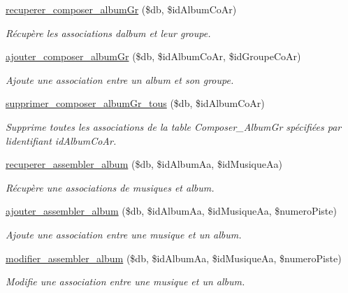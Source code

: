 \begin{DoxyCompactItemize}
\hyperlink{fonctionAlbum_8php_aadff6d61fc94c40b1db762393db06bb7}{recuperer\+\_\+composer\+\_\+album\+Gr} (\$db, \$id\+Album\+Co\+Ar)
\begin{DoxyCompactList}\small\item\em Récupère les associations d\textquotesingle{}album et leur groupe. \end{DoxyCompactList}\item 
\hyperlink{fonctionAlbum_8php_a41addf019effc704735ac3687dcf31bd}{ajouter\+\_\+composer\+\_\+album\+Gr} (\$db, \$id\+Album\+Co\+Ar, \$id\+Groupe\+Co\+Ar)
\begin{DoxyCompactList}\small\item\em Ajoute une association entre un album et son groupe. \end{DoxyCompactList}\item 
\hyperlink{fonctionAlbum_8php_a35ca4d8ff2936c885cded035c4f48b66}{supprimer\+\_\+composer\+\_\+album\+Gr\+\_\+tous} (\$db, \$id\+Album\+Co\+Ar)
\begin{DoxyCompactList}\small\item\em Supprime toutes les associations de la table Composer\+\_\+\+Album\+Gr spécifiées par l\textquotesingle{}identifiant \textquotesingle{}id\+Album\+Co\+Ar\textquotesingle{}. \end{DoxyCompactList}\item 
\hyperlink{fonctionAlbum_8php_a440a43eada75aa71f51ce4512d654a87}{recuperer\+\_\+assembler\+\_\+album} (\$db, \$id\+Album\+Aa, \$id\+Musique\+Aa)
\begin{DoxyCompactList}\small\item\em Récupère une associations de musiques et album. \end{DoxyCompactList}\item 
\hyperlink{fonctionAlbum_8php_addf4cb62b30ad5efff23a08f9f15599a}{ajouter\+\_\+assembler\+\_\+album} (\$db, \$id\+Album\+Aa, \$id\+Musique\+Aa, \$numero\+Piste)
\begin{DoxyCompactList}\small\item\em Ajoute une association entre une musique et un album. \end{DoxyCompactList}\item 
\hyperlink{fonctionAlbum_8php_a15a56f70094024d68b9dd0696b1496e7}{modifier\+\_\+assembler\+\_\+album} (\$db, \$id\+Album\+Aa, \$id\+Musique\+Aa, \$numero\+Piste)
\begin{DoxyCompactList}\small\item\em Modifie une association entre une musique et un album. \end{DoxyCompactList}\item 

\end{DoxyCompactItemize}
